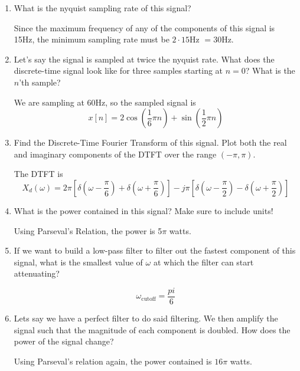 \documentclass{article}
\begin{document}
\begin{enumerate}
    \item What is the nyquist sampling rate of this signal?
    
    Since the maximum frequency of any of the components of this signal is 15Hz, the minimum sampling rate must be $2\cdot 15$Hz $= 30$Hz.

    \item Let's say the signal is sampled at twice the nyquist rate. What does the discrete-time signal look like for three samples starting at $n=0$? What is the $n$'th sample?

    We are sampling at $60$Hz, so the sampled signal is
    $$x[n] = 2\cos\left( \frac{1}{6}\pi n \right) + \sin\left( \frac{1}{2}\pi n \right)$$
   
    \item Find the Discrete-Time Fourier Transform of this signal. Plot both the real and imaginary components of the DTFT over the range $(-\pi, \pi)$.

    The DTFT is
    $$X_{d}(\omega) = 2\pi \left[ \delta\left(\omega - \frac{\pi}{6}\right) + \delta\left(\omega + \frac{\pi}{6}\right) \right] - j \pi \left[ \delta\left(\omega - \frac{\pi}{2}\right) - \delta\left(\omega + \frac{\pi}{2}\right) \right]$$

    \item What is the power contained in this signal? Make sure to include units!

    Using Parseval's Relation, the power is 5$\pi$ watts.

    \item If we want to build a low-pass filter to filter out the fastest component of this signal, what is the smallest value of $\omega$ at which the filter can start attenuating? 

    $$\omega_\text{cutoff} = \frac{pi}{6}$$

    \item Lets say we have a perfect filter to do said filtering. We then amplify the signal such that the magnitude of each component is doubled. How does the power of the signal change?

    Using Parseval's relation again, the power contained is $16\pi$ watts.
    
\end{enumerate}
\end{document}
